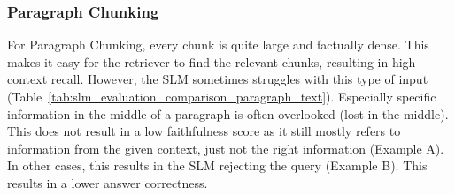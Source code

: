 \documentclass[12pt]{article} %
\begin{document}
\subsubsection{Paragraph Chunking}
For Paragraph Chunking, every chunk is quite large and factually dense. This makes it easy for the retriever to find the relevant chunks, resulting in high context recall.
However, the SLM sometimes struggles with this type of input (Table~\ref{tab:slm_evaluation_comparison_paragraph_text}). Especially specific information in the middle of a paragraph is often overlooked (lost-in-the-middle). This does not result in a low faithfulness score as it still mostly refers to information from the given context, just not the right information (Example A). In other cases, this results in the SLM rejecting the query (Example B). This results in a lower answer correctness.
\end{document}
